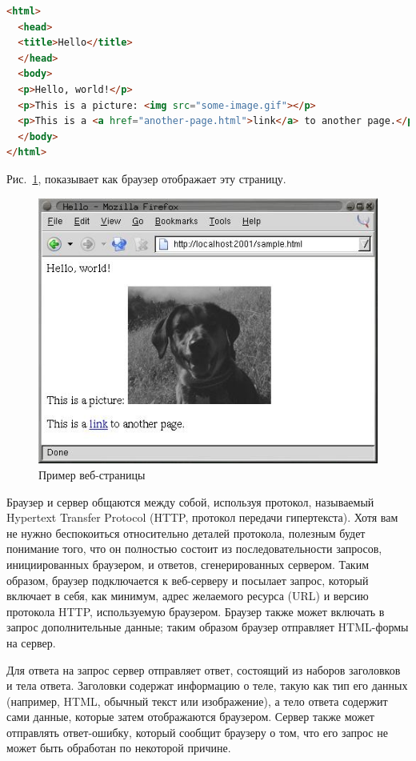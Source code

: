 \begin{lstlisting}[language=HTML]
<html>
  <head>
  <title>Hello</title>
  </head>
  <body>
  <p>Hello, world!</p>
  <p>This is a picture: <img src="some-image.gif"></p>
  <p>This is a <a href="another-page.html">link</a> to another page.</p>
  </body>
</html>
\end{lstlisting}

Рис.~\ref{fig:26-1}, показывает как браузер отображает эту страницу.

\begin{figure}[htb]
  \centering
  \includegraphics[scale=0.7]{images/new-sample.jpg}
  \caption{Пример веб-страницы}
  \label{fig:26-1}
\end{figure}

Браузер и сервер общаются между собой, используя протокол, называемый Hypertext Transfer
Protocol (HTTP, протокол передачи гипертекста). Хотя вам не нужно беспокоиться
относительно деталей протокола, полезным будет понимание того, что он полностью состоит из
последовательности запросов, инициированных браузером, и ответов, сгенерированных
сервером. Таким образом, браузер подключается к веб-серверу и посылает запрос, который
включает в себя, как минимум, адрес желаемого ресурса (URL) и версию протокола HTTP,
используемую браузером. Браузер также может включать в запрос дополнительные данные; таким
образом браузер отправляет HTML-формы на сервер.

Для ответа на запрос сервер отправляет ответ, состоящий из наборов заголовков и тела
ответа. Заголовки содержат информацию о теле, такую как тип его данных (например, HTML,
обычный текст или изображение), а тело ответа содержит сами данные, которые затем
отображаются браузером. Сервер также может отправлять ответ-ошибку, который сообщит
браузеру о том, что его запрос не может быть обработан по некоторой причине.

